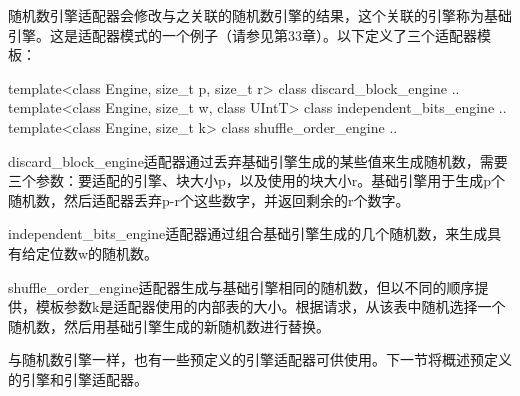 随机数引擎适配器会修改与之关联的随机数引擎的结果，这个关联的引擎称为基础引擎。这是适配器模式的一个例子（请参见第33章）。以下定义了三个适配器模板：

\begin{cpp}
template<class Engine, size_t p, size_t r> class discard_block_engine {..}
template<class Engine, size_t w, class UIntT> class independent_bits_engine {..}
template<class Engine, size_t k> class shuffle_order_engine {..}
\end{cpp}

discard\_block\_engine适配器通过丢弃基础引擎生成的某些值来生成随机数，需要三个参数：要适配的引擎、块大小p，以及使用的块大小r。基础引擎用于生成p个随机数，然后适配器丢弃p-r个这些数字，并返回剩余的r个数字。

independent\_bits\_engine适配器通过组合基础引擎生成的几个随机数，来生成具有给定位数w的随机数。

shuffle\_order\_engine适配器生成与基础引擎相同的随机数，但以不同的顺序提供，模板参数k是适配器使用的内部表的大小。根据请求，从该表中随机选择一个随机数，然后用基础引擎生成的新随机数进行替换。

与随机数引擎一样，也有一些预定义的引擎适配器可供使用。下一节将概述预定义的引擎和引擎适配器。


























